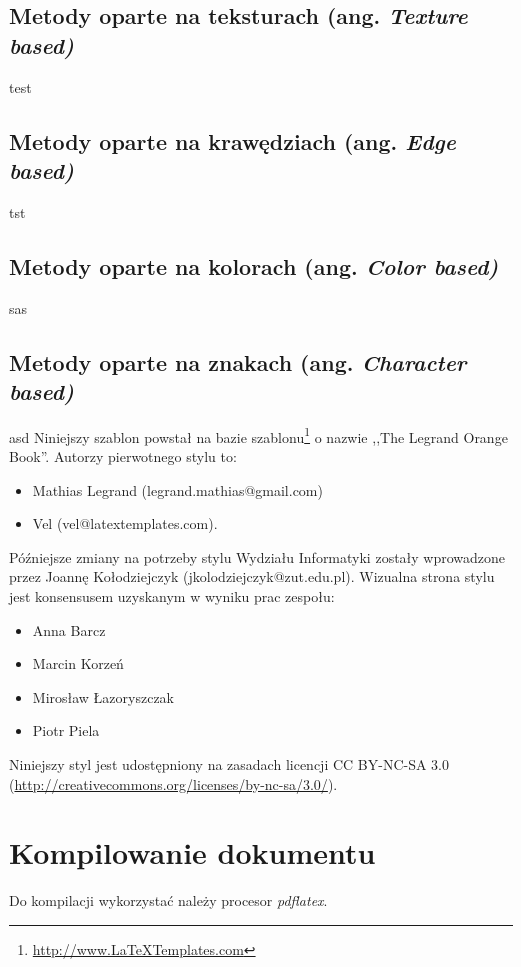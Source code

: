 \subsection{Metody oparte na teksturach (ang. \textit{Texture based)}}
test

\subsection{Metody oparte na krawędziach (ang. \textit{Edge based)}}
tst

\subsection{Metody oparte na kolorach (ang. \textit{Color based)}}
sas

\subsection{Metody oparte na znakach (ang. \textit{Character based)}}
asd
Niniejszy szablon powstał na bazie szablonu\footnote{\url{http://www.LaTeXTemplates.com}} o nazwie ,,The Legrand Orange Book''.
Autorzy pierwotnego stylu to:
\begin{itemize}
    \item Mathias Legrand (legrand.mathias@gmail.com)
    \item Vel (vel@latextemplates.com).
\end{itemize}

Późniejsze zmiany na potrzeby stylu Wydziału Informatyki zostały wprowadzone przez Joannę Kołodziejczyk (jkolodziejczyk@zut.edu.pl). Wizualna strona stylu jest konsensusem uzyskanym w wyniku prac zespołu:
\begin{itemize}
    \item Anna Barcz
    \item Marcin Korzeń
    \item Mirosław Łazoryszczak
    \item Piotr Piela
\end{itemize}

Niniejszy styl jest udostępniony na zasadach licencji CC BY-NC-SA 3.0 ({\url{http://creativecommons.org/licenses/by-nc-sa/3.0/}}).


\section{Kompilowanie dokumentu}

Do kompilacji wykorzystać należy procesor {\em pdflatex}.

